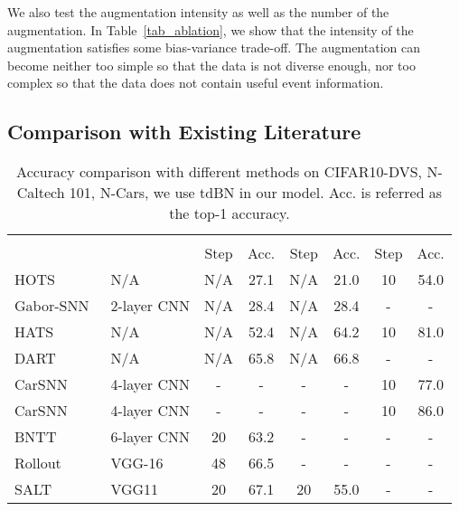 \documentclass[runningheads]{llncs}
\newcommand{\bftab}{\fontseries{b}\selectfont}
\begin{document}
\noindent{\bftab Augmentation Policy.} We also test the augmentation intensity as well as the number of the augmentation. In Table~\ref{tab_ablation}, we show that the intensity of the augmentation satisfies some bias-variance trade-off. 
The augmentation can become neither too simple so that the data is not diverse enough, nor too complex so that the data does not contain useful event information.  


\subsection{Comparison with Existing Literature}
\label{sec_compare}


\begin{table}[t]
   \caption{Accuracy comparison with different methods on CIFAR10-DVS, N-Caltech 101, N-Cars, we use tdBN in our model. Acc. is referred as the top-1 accuracy. }
   \centering
   \begin{adjustbox}{max width=\linewidth}
   \begin{tabular}{llcccccc}
   \toprule 
   \multirow{2}{4em}{\bftab{Method}} &\multirow{2}{4em}{\bftab{Model}}  & \multicolumn{2}{c}{\bftab{CIFAR10-DVS}} & \multicolumn{2}{c}{\bftab{N Caltech-101}} & \multicolumn{2}{c}{\bftab{N-Cars}} \\
   \cmidrule(l{2pt}r{2pt}){3-4}\cmidrule(l{2pt}r{2pt}){5-6}\cmidrule(l{2pt}r{2pt}){7-8}
    & & { Step} & {Acc.} & { Step} & {Acc.} & { Step} & {Acc.} \\
   \midrule
   HOTS~\cite{lagorce2016hots} & N/A & N/A & 27.1 & N/A & 21.0 & 10 & 54.0 \\ 
   Gabor-SNN~\cite{sironi2018hats} & 2-layer CNN & N/A &  28.4 & N/A & 28.4 & - & - \\ 
   HATS~\cite{sironi2018hats} & N/A & N/A & 52.4 & N/A & 64.2 & 10 & 81.0 \\ 
DART~\cite{ramesh2019dart} & N/A & N/A & 65.8 & N/A & 66.8& - & - \\
    CarSNN~\cite{viale2021carsnn} & 4-layer CNN & - & -  & - & - & 10 & 77.0 \\
    CarSNN~\cite{viale2021carsnn} & 4-layer CNN & - & -  & - & - & 10 & 86.0 \\
   BNTT~\cite{kim2020revisiting} & 6-layer CNN & 20 & 63.2 & - & - & - & - \\
   Rollout~\cite{kugele2020efficient} & VGG-16 & 48 & 66.5 & - & - & - & - \\
   SALT~\cite{kim2021optimizing} &  VGG11 & 20 & 67.1 & 20 & 55.0 & - & -\\ 

\end{tabular}
\end{adjustbox}
\end{table}
\end{document}
